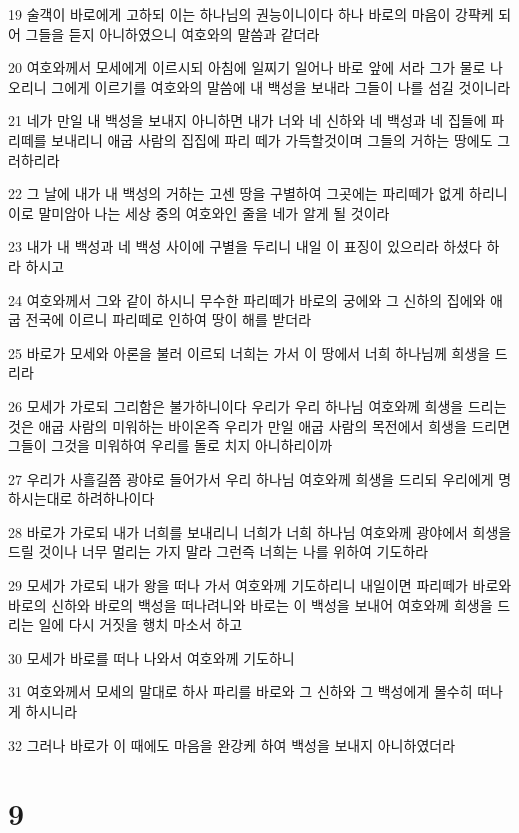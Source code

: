 \par 19 술객이 바로에게 고하되 이는 하나님의 권능이니이다 하나 바로의 마음이 강퍅케 되어 그들을 듣지 아니하였으니 여호와의 말씀과 같더라
\par 20 여호와께서 모세에게 이르시되 아침에 일찌기 일어나 바로 앞에 서라 그가 물로 나오리니 그에게 이르기를 여호와의 말씀에 내 백성을 보내라 그들이 나를 섬길 것이니라
\par 21 네가 만일 내 백성을 보내지 아니하면 내가 너와 네 신하와 네 백성과 네 집들에 파리떼를 보내리니 애굽 사람의 집집에 파리 떼가 가득할것이며 그들의 거하는 땅에도 그러하리라
\par 22 그 날에 내가 내 백성의 거하는 고센 땅을 구별하여 그곳에는 파리떼가 없게 하리니 이로 말미암아 나는 세상 중의 여호와인 줄을 네가 알게 될 것이라
\par 23 내가 내 백성과 네 백성 사이에 구별을 두리니 내일 이 표징이 있으리라 하셨다 하라 하시고
\par 24 여호와께서 그와 같이 하시니 무수한 파리떼가 바로의 궁에와 그 신하의 집에와 애굽 전국에 이르니 파리떼로 인하여 땅이 해를 받더라
\par 25 바로가 모세와 아론을 불러 이르되 너희는 가서 이 땅에서 너희 하나님께 희생을 드리라
\par 26 모세가 가로되 그리함은 불가하니이다 우리가 우리 하나님 여호와께 희생을 드리는 것은 애굽 사람의 미워하는 바이온즉 우리가 만일 애굽 사람의 목전에서 희생을 드리면 그들이 그것을 미워하여 우리를 돌로 치지 아니하리이까
\par 27 우리가 사흘길쯤 광야로 들어가서 우리 하나님 여호와께 희생을 드리되 우리에게 명하시는대로 하려하나이다
\par 28 바로가 가로되 내가 너희를 보내리니 너희가 너희 하나님 여호와께 광야에서 희생을 드릴 것이나 너무 멀리는 가지 말라 그런즉 너희는 나를 위하여 기도하라
\par 29 모세가 가로되 내가 왕을 떠나 가서 여호와께 기도하리니 내일이면 파리떼가 바로와 바로의 신하와 바로의 백성을 떠나려니와 바로는 이 백성을 보내어 여호와께 희생을 드리는 일에 다시 거짓을 행치 마소서 하고
\par 30 모세가 바로를 떠나 나와서 여호와께 기도하니
\par 31 여호와께서 모세의 말대로 하사 파리를 바로와 그 신하와 그 백성에게 몰수히 떠나게 하시니라
\par 32 그러나 바로가 이 때에도 마음을 완강케 하여 백성을 보내지 아니하였더라

\chapter{9}

